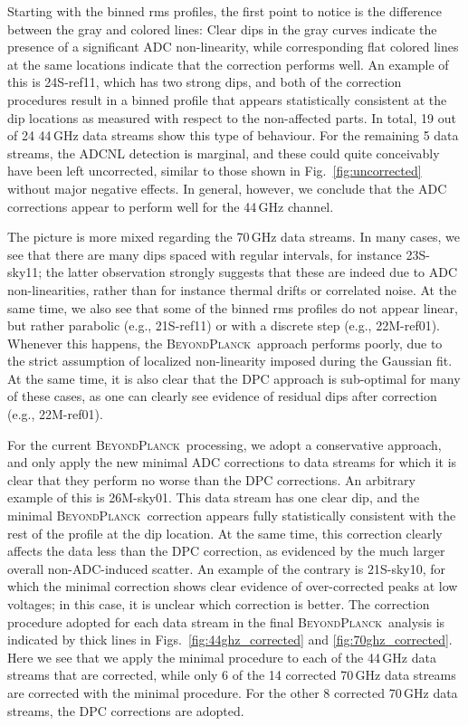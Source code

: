 \documentclass[twocolumn]{aa}
\newcommand{\BP}{\textsc{BeyondPlanck}}
\begin{document}
Starting with the binned rms profiles, the first point to notice is the difference between the gray and colored lines: Clear dips in the gray curves indicate the presence of a significant ADC non-linearity, while corresponding flat colored lines at the same locations indicate that the correction performs well. An example of this is 24S-ref11, which has two strong dips, and both of the correction procedures result in a binned profile that appears statistically consistent at the dip locations as measured with respect to the non-affected parts. In total, 19 out of 24 44\,GHz data streams show this type of behaviour. For the remaining 5 data streams, the ADCNL detection is marginal, and these could quite conceivably have been left uncorrected, similar to those shown in Fig.~\ref{fig:uncorrected} without major negative effects. In general, however, we conclude that the ADC corrections appear to perform well for the 44\,GHz channel.

The picture is more mixed regarding the 70\,GHz data streams. In many cases, we see that there are many dips spaced with regular intervals, for instance 23S-sky11; the latter observation strongly suggests that these are indeed due to ADC non-linearities, rather than for instance thermal drifts or correlated noise. At the same time, we also see that some of the binned rms profiles do not appear linear, but rather parabolic (e.g., 21S-ref11) or with a discrete step (e.g., 22M-ref01). Whenever this happens, the \BP\ approach performs poorly, due to the strict assumption of localized non-linearity imposed during the Gaussian fit. At the same time, it is also clear that the DPC approach is sub-optimal for many of these cases, as one can clearly see evidence of residual dips after correction (e.g., 22M-ref01).

For the current \BP\ processing, we adopt a conservative approach, and only apply the new minimal ADC corrections to data streams for which it is clear that they perform no worse than the DPC corrections. An arbitrary example of this is 26M-sky01. This data stream has one clear dip, and the minimal \BP\ correction appears fully statistically consistent with the rest of the profile at the dip location. At the same time, this correction clearly affects the data less than the DPC correction, as evidenced by the much larger overall non-ADC-induced scatter. An example of the contrary is 21S-sky10, for which the minimal correction shows clear evidence of over-corrected peaks at low voltages; in this case, it is unclear which correction is better. The correction procedure adopted for each data stream in the final \BP\ analysis is indicated by thick lines in Figs.~\ref{fig:44ghz_corrected} and \ref{fig:70ghz_corrected}. Here we see that we apply the minimal procedure to each of the 44\,GHz data streams that are corrected, while only 6 of the 14 corrected 70\,GHz data streams are corrected with the minimal procedure. For the other 8 corrected 70\,GHz data streams, the DPC corrections are adopted.
\end{document}
